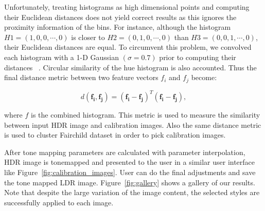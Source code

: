 Unfortunately, treating histograms as high dimensional points and computing their Euclidean distances does not yield correct results as this ignores the proximity information of the bins. For instance, although the histogram $H1 = (1, 0, 0, \cdots, 0)$ is closer to
$H2 = (0, 1, 0, \cdots, 0)$ than $H3 = (0, 0, 1, \cdots, 0)$, their Euclidean distances are equal. To circumvent this problem, we convolved each histogram with a 1-D Gaussian $(\sigma = 0.7)$ prior to computing their distances ~\cite{Ben2006}. Circular similarity of the hue histogram is also accounted. Thus the final distance metric between two feature vectors \textbf{$f_i$} and \textbf{$f_j$} become:

\begin{equation}
    d(\mathbf{f_i, f_j}) = \mathbf{(f_i - f_j)}^T\mathbf{(f_i-f_j)},
\end{equation}

where \textbf{$f$} is the combined histogram. This metric is used to measure the similarity between input HDR image and calibration images. Also the same distance metric is used to cluster Fairchild dataset in order to pick calibration images.

After tone mapping parameters are calculated with parameter interpolation, HDR image is tonemapped and presented to the user in a similar user interface like Figure~\ref{fig:calibration_images}. User can do the final adjustments and save the tone mapped LDR image. Figure~\ref{fig:gallery} shows a gallery of our results. Note that despite the large variation of the image content, the selected styles are successfully applied to each image.

